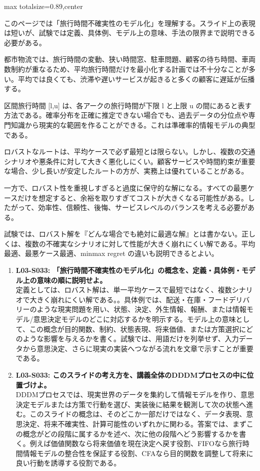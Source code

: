 \begin{minipage}[t]{0.58\textwidth}
\begin{adjustbox}{max totalsize={\textwidth}{0.89\textheight},center}
\begin{minipage}{\textwidth}\scriptsize
{}このページでは「旅行時間不確実性のモデル化」を理解する。スライド上の表現は短いが、試験では定義、具体例、モデル上の意味、手法の限界まで説明できる必要がある。\par
都市物流では、旅行時間の変動、狭い時間窓、駐車問題、顧客の待ち時間、車両数制約が重なるため、平均旅行時間だけを最小化する計画では不十分なことが多い。平均では良くても、渋滞や遅いサービスが起きると多くの顧客に遅延が伝播する。\par
区間旅行時間 [l,u] は、各アークの旅行時間が下限 l と上限 u の間にあると表す方法である。確率分布を正確に推定できない場合でも、過去データの分位点や専門知識から現実的な範囲を作ることができる。これは準確率的情報モデルの典型である。\par
ロバストなルートは、平均ケースで必ず最短とは限らない。しかし、複数の交通シナリオや悪条件に対して大きく悪化しにくい。顧客サービスや時間約束が重要な場合、少し長いが安定したルートの方が、実務上は優れていることがある。\par
一方で、ロバスト性を重視しすぎると過度に保守的な解になる。すべての最悪ケースだけを想定すると、余裕を取りすぎてコストが大きくなる可能性がある。したがって、効率性、信頼性、後悔、サービスレベルのバランスを考える必要がある。\par
試験では、ロバスト解を『どんな場合でも絶対に最適な解』とは書かない。正しくは、複数の不確実なシナリオに対して性能が大きく崩れにくい解である。平均最適、最悪ケース最適、minmax regret の違いも説明できるとよい。\par{}\begin{enumerate}\item \textbf{L03-S033: 「旅行時間不確実性のモデル化」の概念を、定義・具体例・モデル上の意味の順に説明せよ。}\\定義としては、ロバスト解は、単一平均ケースで最短ではなく、複数シナリオで大きく崩れにくい解である。。具体例では、配送・在庫・フードデリバリーのような現実問題を用い、状態、決定、外生情報、報酬、または情報モデル/意思決定モデルのどこに対応するかを明示する。モデル上の意味として、この概念が目的関数、制約、状態表現、将来価値、または方策選択にどのような影響を与えるかを書く。試験では、用語だけを列挙せず、入力データから意思決定、さらに現実の実装へつながる流れを文章で示すことが重要である。\item \textbf{L03-S033: このスライドの考え方を、講義全体のDDDMプロセスの中に位置づけよ。}\\DDDMプロセスでは、現実世界のデータを集約して情報モデルを作り、意思決定モデルまたは方策で行動を選び、実装後に結果を観測して次の状態へ進む。このスライドの概念は、そのどこか一部だけではなく、データ表現、意思決定、将来不確実性、計算可能性のいずれかに関わる。答案では、まずこの概念がどの段階に属するかを述べ、次に他の段階へどう影響するかを書く。例えば価値関数なら将来価値を現在決定へ戻す役割、FIFOなら旅行時間情報モデルの整合性を保証する役割、CFAなら目的関数を調整して将来に良い行動を誘導する役割である。\end{enumerate}

\end{minipage}
\end{adjustbox}
\end{minipage}
